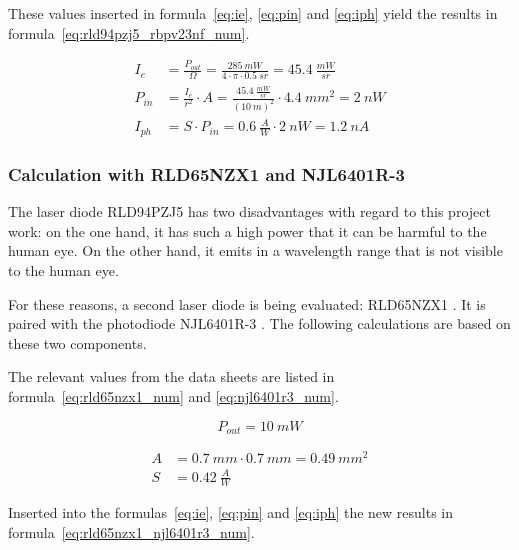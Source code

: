 These values inserted in formula~\ref{eq:ie}, \ref{eq:pin} and \ref{eq:iph} yield the results in
formula~\ref{eq:rld94pzj5_rbpv23nf_num}.

\begin{equation}\label{eq:rld94pzj5_rbpv23nf_num}
    \begin{split}
        I_e    & = \frac{P_{out}}{\Omega} = \frac{285~mW}{4\cdot \pi \cdot 0.5~sr} = 45.4~\frac{mW}{sr} \\
        P_{in} & = \frac{I_e}{r^2} \cdot A = \frac{45.4~\frac{mW}{sr}}{(10~m)^2} \cdot 4.4~mm^2 = 2~nW  \\
        I_{ph} & = S \cdot P_{in} = 0.6~\frac{A}{W} \cdot 2~nW = 1.2~nA
    \end{split}
\end{equation}

\subsubsection{Calculation with RLD65NZX1 and NJL6401R-3}

The laser diode RLD94PZJ5 has two disadvantages with regard to this project work: on the one hand, it has such a high power that
it can be harmful to the human eye. On the other hand, it emits in a wavelength range that
is not visible to the human eye.

For these reasons, a second laser diode is being evaluated: RLD65NZX1 \cite{rohm2019rld65nzx1_datasheet}. It is paired
with the photodiode NJL6401R-3 \cite{jrc2014njl6401r3_datasheet}. The following calculations are based on
these two components.

The relevant values from the data sheets are listed in formula~\ref{eq:rld65nzx1_num} and \ref{eq:njl6401r3_num}.

\begin{equation}\label{eq:rld65nzx1_num}
    P_{out} = 10~mW
\end{equation}

\begin{equation}\label{eq:njl6401r3_num}
    \begin{split}
        A & = 0.7~mm \cdot 0.7~mm = 0.49~mm^2 \\
        S & = 0.42~\frac{A}{W}
    \end{split}
\end{equation}

Inserted into the formulas~\ref{eq:ie}, \ref{eq:pin} and \ref{eq:iph} the new results in
formula~\ref{eq:rld65nzx1_njl6401r3_num}.

